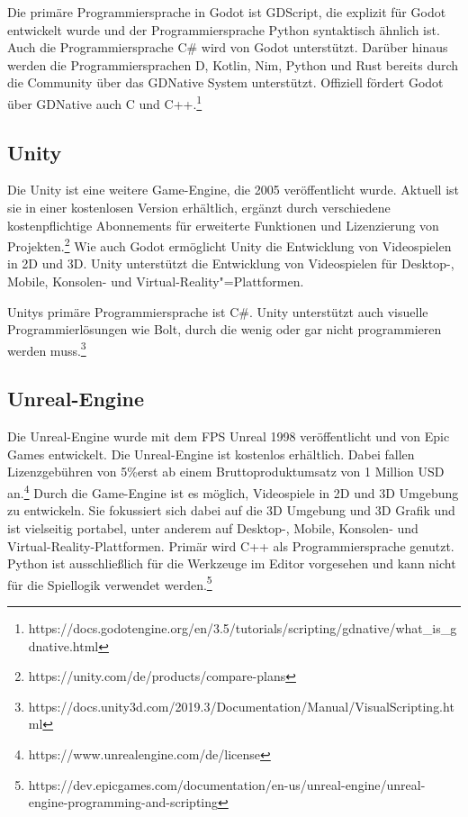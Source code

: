Die prim\"{a}re Programmiersprache in Godot ist GDScript, die explizit f\"{u}r Godot entwickelt wurde und der Programmiersprache Python syntaktisch \"{a}hnlich ist. Auch die Programmiersprache C# wird von Godot unterst\"{u}tzt. Dar\"{u}ber hinaus werden die Programmiersprachen D, Kotlin, Nim, Python und Rust bereits durch die Community \"{u}ber das GDNative System unterst\"{u}tzt. Offiziell f\"{o}rdert Godot \"{u}ber GDNative auch C und C++.\footnote{https://docs.godotengine.org/en/3.5/tutorials/scripting/gdnative/what_is_gdnative.html}

\subsection{Unity}
\label{chap:unity}


Die Unity ist eine weitere Game-Engine, die 2005 ver\"{o}ffentlicht wurde. Aktuell ist sie in einer kostenlosen Version erh\"{a}ltlich, erg\"{a}nzt durch verschiedene kostenpflichtige Abonnements f\"{u}r erweiterte Funktionen und Lizenzierung von Projekten.\footnote{https://unity.com/de/products/compare-plans} Wie auch Godot erm\"{o}glicht Unity die Entwicklung von Videospielen in 2D und 3D. Unity unterst\"{u}tzt die Entwicklung von Videospielen f\"{u}r Desktop-, Mobile, Konsolen- und Virtual-Reality"=Plattformen.

Unitys prim\"{a}re Programmiersprache ist C#. Unity unterst\"{u}tzt auch visuelle Programmierl\"{o}sungen wie Bolt, durch die wenig oder gar nicht programmieren werden muss.\footnote{https://docs.unity3d.com/2019.3/Documentation/Manual/VisualScripting.html}

\subsection{Unreal-Engine}
\label{chap:unreal-engine}

Die Unreal-Engine wurde mit dem FPS Unreal 1998 ver\"{o}ffentlicht und von Epic Games entwickelt. Die Unreal-Engine ist kostenlos erh\"{a}ltlich. Dabei fallen Lizenzgeb\"{u}hren von 5\%erst ab einem Bruttoproduktumsatz von 1 Million USD an.\footnote{https://www.unrealengine.com/de/license} Durch die Game-Engine ist es m\"{o}glich, Videospiele in 2D und 3D Umgebung zu entwickeln. Sie fokussiert sich dabei auf die 3D Umgebung und 3D Grafik und ist vielseitig portabel, unter anderem auf Desktop-, Mobile, Konsolen- und Virtual-Reality-Plattformen. 
Prim\"{a}r wird C++ als Programmiersprache genutzt. Python ist ausschlie\ss{}lich f\"{u}r die Werkzeuge im Editor vorgesehen und kann nicht f\"{u}r die Spiellogik verwendet werden.\footnote{https://dev.epicgames.com/documentation/en-us/unreal-engine/unreal-engine-programming-and-scripting}


